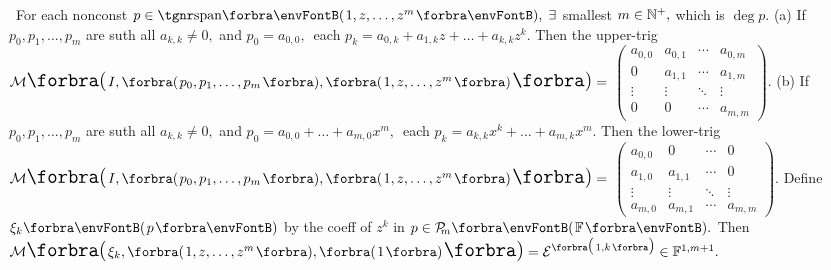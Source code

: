\BulletPointX{} \,\,\,For each nonconst $p\in\Span{1,z,\dots,z^m},\;\exists$ smallest $m\in{\mathbb{N}^+},$ which is $\deg p.$\TextB{}
(a) If $p_0,p_1,\dots,p_m$ are suth all $a_{k,k}\neq 0,$ and\TextB{}
\Hb $p_0=a_{0,0},\,$ each $p_k=a_{0,k}+a_{1,k}z+\dots+a_{k,k}z^k.$\TextB{\vspace{-18pt}}
\Ha Then the upper-trig $\Mt[\envFontLarge\BigPar]{\envFontDefault I,\Par{p_0,p_1,\dots,p_m},\Par{1,z,\dots,z^m}\envFontLarge}={}${\small$\begin{pmatrix}
		a_{0,0} & a_{0,1} & \cdots & a_{0,m}\\
		0       & a_{1,1} & \cdots & a_{1,m}\\
		\vdots  & \vdots  & \ddots & \vdots\\
		0       & 0       & \cdots & a_{m,m}
	\end{pmatrix}$}.\TextB{\vspace{-8pt}}
(b) If $p_0,p_1,\dots,p_m$ are suth all $a_{k,k}\neq 0,$ and\TextB{}
\Hb $p_0=a_{0,0}+\dots+a_{m,0}x^m,\,$ each $p_k=a_{k,k}x^k+\dots+a_{m,k}x^m.$\TextB{\vspace{-18pt}}
\Hb Then the lower-trig \;$\Mt[\envFontLarge\BigPar]{\envFontDefault I,\Par{p_0,p_1,\dots,p_m},\Par{1,z,\dots,z^m}\envFontLarge}={}${\small$\begin{pmatrix}
		a_{0,0} & 0       & \cdots & 0\\
		a_{1,0} & a_{1,1} & \cdots & 0\\
		\vdots  & \vdots  & \ddots & \vdots\\
		a_{m,0} & a_{m,1} & \cdots & a_{m,m}
	\end{pmatrix}$}.\TextB{\vspace{-12pt}}
\AComm Define $\xi_k\Par{p}$ by the coeff of $z^k$ in $p\in\PoF{m}.$\parCom\IndentB{}
Then $\Mt[\envFontLarge\BigPar]{\envFontDefault\xi_k,\Par{1,z,\dots,z^m},\Par{1}\envFontLarge}=\mathcal{E}^{\SmallPar[1pt]{1,k}}\in\Fbb^{1,m+1}.$\vspace{-2pt}
\SepLine\pagebreak

